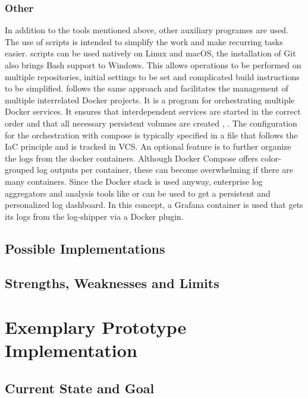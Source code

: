 \documentclass[12pt, a4paper]{article}
\begin{document}
        \subsubsection{Other}
        In addition to the tools mentioned above, other auxiliary programes are used. The use of scripts is intended to simplify the work and make recurring tasks easier.  scripts can be used natively on Linux and macOS, the installation of Git also brings Bash support to Windows. This allows operations to be performed on multiple repositories, initial settings to be set and complicated build instructions to be simplified.  follows the same approach and facilitates the management of multiple interrelated Docker projects. It is a program for orchestrating multiple Docker services. It ensures that interdependent services are started in the correct order and that all necessary persistent volumes are created \cite{docker2020}, \cite{dockerdocs}. The configuration for the orchestration with compose is typically specified in a  file that follows the \ac{IaC} principle and is tracked in \ac{VCS}. An optional feature is to further organize the logs from the docker containers. Although Docker Compose offers color-grouped log outputs per container, these can become overwhelming if there are many containers. Since the Docker stack is used anyway, enterprise log aggregators and analysis tools like  or  can be used to get a persistent and personalized log dashboard. In this concept, a Grafana container is used that gets its logs from the  log-shipper via a Docker plugin.

    \subsection{Possible Implementations}
    \subsection{Strengths, Weaknesses and Limits}\label{ssec::limits}\newpage

\section{Exemplary Prototype Implementation}\label{sec::solution_code}
    
    \subsection{Current State and Goal}
\end{document}
